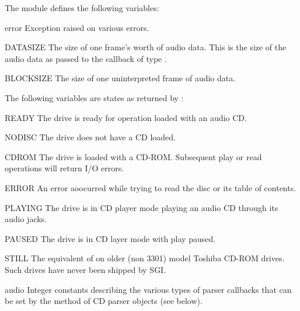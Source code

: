 The module defines the following variables:

\begin{datadesc}{error}
Exception raised on various errors.
\end{datadesc}

\begin{datadesc}{DATASIZE}
The size of one frame's worth of audio data.  This is the size of the
audio data as passed to the callback of type .
\end{datadesc}

\begin{datadesc}{BLOCKSIZE}
The size of one uninterpreted frame of audio data.
\end{datadesc}

The following variables are states as returned by :

\begin{datadesc}{READY}
The drive is ready for operation loaded with an audio CD.
\end{datadesc}

\begin{datadesc}{NODISC}
The drive does not have a CD loaded.
\end{datadesc}

\begin{datadesc}{CDROM}
The drive is loaded with a CD-ROM.  Subsequent play or read operations
will return I/O errors.
\end{datadesc}

\begin{datadesc}{ERROR}
An error aoocurred while trying to read the disc or its table of
contents.
\end{datadesc}

\begin{datadesc}{PLAYING}
The drive is in CD player mode playing an audio CD through its audio
jacks.
\end{datadesc}

\begin{datadesc}{PAUSED}
The drive is in CD layer mode with play paused.
\end{datadesc}

\begin{datadesc}{STILL}
The equivalent of  on older (non 3301) model Toshiba
CD-ROM drives.  Such drives have never been shipped by SGI.
\end{datadesc}

\begin{datadesc}{audio}
Integer constants describing the various types of parser callbacks
that can be set by the  method of CD parser
objects (see below).
\end{datadesc}

